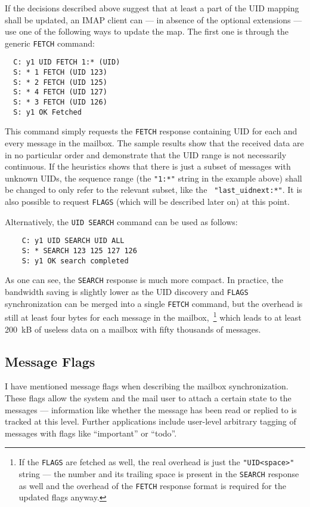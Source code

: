 \documentclass[trojita]{subfiles}
\begin{document}
If the decisions described above suggest that at least a part of the UID mapping shall be updated, an IMAP client can
--- in absence of the optional extensions --- use one of the following ways to update the map.  The first one is through
the generic {\tt FETCH} command:

\begin{verbatim}
  C: y1 UID FETCH 1:* (UID)
  S: * 1 FETCH (UID 123)
  S: * 2 FETCH (UID 125)
  S: * 4 FETCH (UID 127)
  S: * 3 FETCH (UID 126)
  S: y1 OK Fetched
\end{verbatim}

This command simply requests the {\tt FETCH} response containing UID for each and every message in the mailbox.  The
sample results show that the received data are in no particular order and demonstrate that the UID range is not
necessarily continuous.  If the heuristics shows that there is just a subset of messages with unknown UIDs, the sequence
range (the {\tt "1:*"} string in the example above) shall be changed to only refer to the relevant subset, like the {\tt
"last\_uidnext:*"}.  It is also possible to request {\tt FLAGS} (which will be described later on) at this point.

Alternatively, the {\tt UID SEARCH} command can be used as follows:

\begin{verbatim}
    C: y1 UID SEARCH UID ALL
    S: * SEARCH 123 125 127 126
    S: y1 OK search completed
\end{verbatim}

As one can see, the {\tt SEARCH} response is much more compact.  In practice, the bandwidth saving is slightly lower as
the UID discovery and {\tt FLAGS} synchronization can be merged into a single {\tt FETCH} command, but the overhead is
still at least four bytes for each message in the mailbox,~\footnote{If the {\tt FLAGS} are fetched as well, the real
overhead is just the {\tt "UID<space>"} string --- the number and its trailing space is present in the {\tt SEARCH}
response as well and the overhead of the {\tt FETCH} response format is required for the updated flags anyway.} which
leads to at least 200~kB of useless data on a mailbox with fifty thousands of messages.

\subsection{Message Flags}

I have mentioned message flags when describing the mailbox synchronization.  These flags allow the system and the mail
user to attach a certain state to the messages --- information like whether the message has been read or replied to is
tracked at this level.  Further applications include user-level arbitrary tagging of messages with flags like
``important'' or ``todo''.
\end{document}
